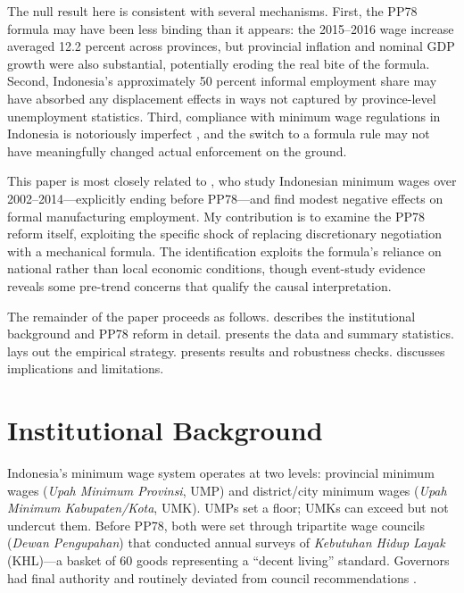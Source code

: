 \documentclass[12pt]{article}
\begin{document}
The null result here is consistent with several mechanisms. First, the PP78 formula may have been less binding than it appears: the 2015--2016 wage increase averaged 12.2 percent across provinces, but provincial inflation and nominal GDP growth were also substantial, potentially eroding the real bite of the formula. Second, Indonesia's approximately 50 percent informal employment share \citep{world2015indonesia} may have absorbed any displacement effects in ways not captured by province-level unemployment statistics. Third, compliance with minimum wage regulations in Indonesia is notoriously imperfect \citep{harrison2004global, alatas2004does}, and the switch to a formula rule may not have meaningfully changed actual enforcement on the ground.

This paper is most closely related to \citet{merdikawati2025wage}, who study Indonesian minimum wages over 2002--2014---explicitly ending before PP78---and find modest negative effects on formal manufacturing employment. My contribution is to examine the PP78 reform itself, exploiting the specific shock of replacing discretionary negotiation with a mechanical formula. The identification exploits the formula's reliance on national rather than local economic conditions, though event-study evidence reveals some pre-trend concerns that qualify the causal interpretation.

The remainder of the paper proceeds as follows.  describes the institutional background and PP78 reform in detail.  presents the data and summary statistics.  lays out the empirical strategy.  presents results and robustness checks.  discusses implications and limitations.


\section{Institutional Background}
\label{sec:background}

Indonesia's minimum wage system operates at two levels: provincial minimum wages (\textit{Upah Minimum Provinsi}, UMP) and district/city minimum wages (\textit{Upah Minimum Kabupaten/Kota}, UMK). UMPs set a floor; UMKs can exceed but not undercut them. Before PP78, both were set through tripartite wage councils (\textit{Dewan Pengupahan}) that conducted annual surveys of \textit{Kebutuhan Hidup Layak} (KHL)---a basket of 60 goods representing a ``decent living'' standard. Governors had final authority and routinely deviated from council recommendations \citep{bird2008minimum}.
\end{document}
